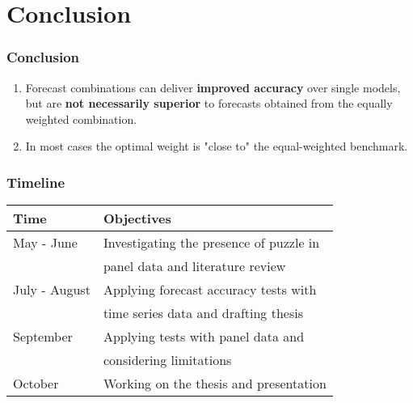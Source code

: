 
\section{Conclusion}

\begin{frame}
	\frametitle{Conclusion}
 
 \begin{enumerate}
     \item Forecast combinations can deliver \textbf{improved accuracy} over single models, but are \textbf{not necessarily superior} to forecasts obtained from the equally weighted combination.
     \vspace{5mm}
     \item In most cases the optimal weight is "close to" the equal-weighted benchmark.
 \end{enumerate}

\end{frame}


\begin{frame}
	\frametitle{Timeline}
 
 \begin{table}[htbp]
  \centering
    \begin{tabular}{ll}
    Time  & Objectives \\
    \midrule
    May - June & Investigating the presence of puzzle in \\
               & panel data and literature review \\
    \midrule
    July - August & Applying forecast accuracy tests with \\
                  & time series data and drafting thesis  \\
    \midrule
    September & Applying tests with panel data and \\
              & considering limitations \\
    \midrule
    October & Working on the thesis and presentation \\
    \bottomrule
    \end{tabular}
\end{table}


\end{frame}
